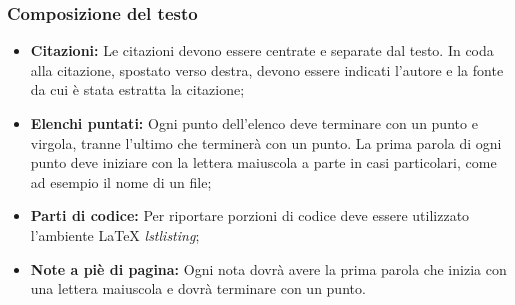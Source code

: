 \subsubsection{Composizione del testo}

\begin{itemize}
\item \textbf{Citazioni:} Le citazioni devono essere centrate e separate dal testo. In coda alla citazione, spostato verso destra, devono essere indicati l'autore e la fonte da cui è stata estratta la citazione;
\item \textbf{Elenchi puntati:} Ogni punto dell'elenco deve terminare con un punto e virgola, tranne l'ultimo che terminerà con un punto. La prima parola di ogni punto deve iniziare con la lettera maiuscola a parte in casi particolari, come ad esempio il nome di un file;
\item \textbf{Parti di codice:} Per riportare porzioni di codice deve essere utilizzato l'ambiente \LaTeX{} \textit{lstlisting};
\item \textbf{Note a piè di pagina:} Ogni nota dovrà avere la prima parola  che inizia con una lettera maiuscola e dovrà terminare con un punto.
\end{itemize}

